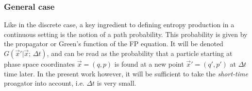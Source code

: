\subsubsection{General case}
\label{sec:general propagator case}

Like in the discrete case, a key ingredient to defining entropy production in a continuous setting is the notion of a path probability. This probability is given by the propagator or Green's function of the FP equation. It will be denoted \(G(\vec x'|\vec x;\,\Delta t)\), and can be read as the probability that a particle starting at phase space coordinates \(\vec x = (q,p)\) is found at a new point \(\vec x' = (q',p')\) at \(\Delta t\) time later. In the present work however, it will be sufficient to take the \emph{short-time} proagator into account, i.e. \(\Delta t\) is very small.

